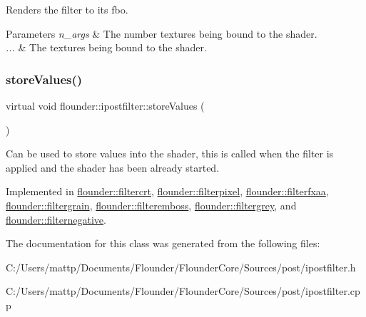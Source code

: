 Renders the filter to its fbo. 


\begin{DoxyParams}{Parameters}
{\em n\+\_\+args} & The number textures being bound to the shader. \\
\hline
{\em ...} & The textures being bound to the shader. \\
\hline
\end{DoxyParams}
\mbox{\label{classflounder_1_1ipostfilter_a9b658b4672718d5ac36539875bde722e}} 
\subsubsection{\texorpdfstring{store\+Values()}{storeValues()}}
{\footnotesize\ttfamily virtual void flounder\+::ipostfilter\+::store\+Values (\begin{DoxyParamCaption}{ }\end{DoxyParamCaption})\hspace{0.3cm}{\ttfamily [pure virtual]}}



Can be used to store values into the shader, this is called when the filter is applied and the shader has been already started. 



Implemented in \hyperlink{classflounder_1_1filtercrt_a6b3d151d6e338a7c859aeea1016724dc}{flounder\+::filtercrt}, \hyperlink{classflounder_1_1filterpixel_abc7ae2b0a9bffd4986a664b690aab416}{flounder\+::filterpixel}, \hyperlink{classflounder_1_1filterfxaa_abee255cfd538d96881386157e6e8eea0}{flounder\+::filterfxaa}, \hyperlink{classflounder_1_1filtergrain_a0f65f9e8b994f18a4777e4451bdf8b4e}{flounder\+::filtergrain}, \hyperlink{classflounder_1_1filteremboss_aa0c7d249c2c830036904bede59dababf}{flounder\+::filteremboss}, \hyperlink{classflounder_1_1filtergrey_a927f448820b39299eb04c947ffdce671}{flounder\+::filtergrey}, and \hyperlink{classflounder_1_1filternegative_abc832140c4d75f4684d3470e070bcf7a}{flounder\+::filternegative}.



The documentation for this class was generated from the following files\+:\begin{DoxyCompactItemize}
\item 
C\+:/\+Users/mattp/\+Documents/\+Flounder/\+Flounder\+Core/\+Sources/post/ipostfilter.\+h\item 
C\+:/\+Users/mattp/\+Documents/\+Flounder/\+Flounder\+Core/\+Sources/post/ipostfilter.\+cpp\end{DoxyCompactItemize}
